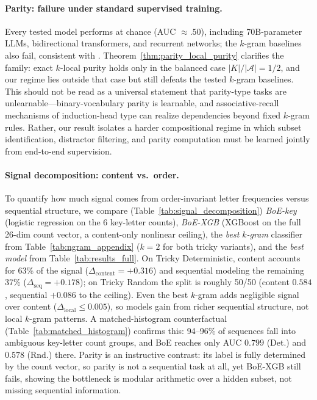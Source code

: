 \documentclass{article}
\theoremstyle{plain}
\theoremstyle{definition}
\theoremstyle{remark}
\begin{document}
\paragraph{Parity: failure under standard supervised training.}
Every tested model performs at chance (AUC $\approx .50$), including 70B-parameter LLMs, bidirectional transformers, and recurrent networks; the $k$-gram baselines also fail, consistent with \citet{countingLLMs}. Theorem~\ref{thm:parity_local_purity} clarifies the family: exact $k$-local purity holds only in the balanced case $|K|/|\mathcal{A}|{=}1/2$, and our regime lies outside that case but still defeats the tested $k$-gram baselines. This should not be read as a universal statement that parity-type tasks are unlearnable---binary-vocabulary parity is learnable, and associative-recall mechanisms of induction-head type can realize dependencies beyond fixed $k$-gram rules. Rather, our result isolates a harder compositional regime in which subset identification, distractor filtering, and parity computation must be learned jointly from end-to-end supervision.

\paragraph{Signal decomposition: content vs.\ order.}
To quantify how much signal comes from order-invariant letter frequencies versus sequential structure, we compare (Table~\ref{tab:signal_decomposition}) \emph{BoE-key} (logistic regression on the 6 key-letter counts), \emph{BoE-XGB} (XGBoost on the full 26-dim count vector, a content-only nonlinear ceiling), the \emph{best $k$-gram} classifier from Table~\ref{tab:ngram_appendix} ($k{=}2$ for both tricky variants), and the \emph{best model} from Table~\ref{tab:results_full}. On Tricky Deterministic, content accounts for 63\% of the signal ($\Delta_{\text{content}}{=}{+}0.316$) and sequential modeling the remaining 37\% ($\Delta_{\text{seq}}{=}{+}0.178$); on Tricky Random the split is roughly 50/50 (content $0.584$, sequential $+0.086$ to the ceiling). Even the best $k$-gram adds negligible signal over content ($\Delta_{\text{local}}\le 0.005$), so models gain from richer sequential structure, not local $k$-gram patterns. A matched-histogram counterfactual (Table~\ref{tab:matched_histogram}) confirms this: 94--96\% of sequences fall into ambiguous key-letter count groups, and BoE reaches only AUC $0.799$ (Det.) and $0.578$ (Rnd.) there. Parity is an instructive contrast: its label is fully determined by the count vector, so parity is not a sequential task at all, yet BoE-XGB still fails, showing the bottleneck is modular arithmetic over a hidden subset, not missing sequential information.
\end{document}
